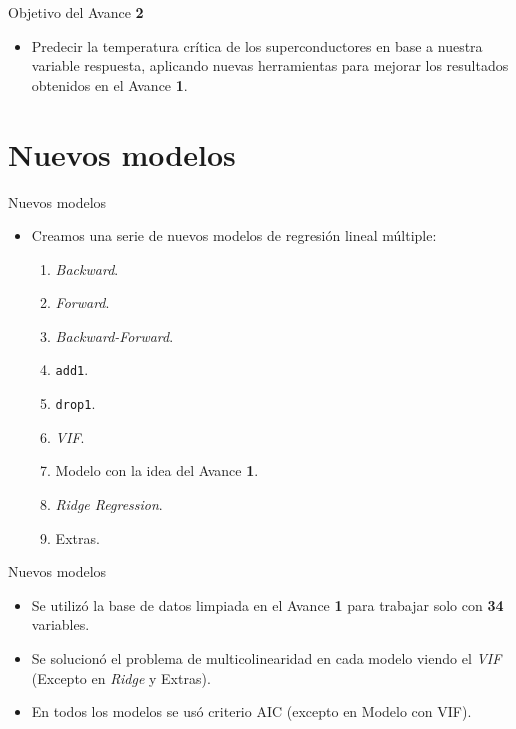 \documentclass[11pt]{beamer}
\newcommand{\cod}[1]{\texttt{\frenchspacing#1}}
\begin{document}
\begin{frame}{Objetivo del Avance \textbf{2}}
	\begin{itemize}
		\item Predecir la temperatura crítica de los superconductores en base a nuestra variable respuesta, aplicando nuevas herramientas para mejorar los resultados obtenidos en el Avance \textbf{1}.
	\end{itemize}
\end{frame}


\section{Nuevos modelos}

\begin{frame}{Nuevos modelos}
	\begin{itemize}
		\item Creamos una serie de nuevos modelos de regresión lineal múltiple:
		\begin{enumerate}
			\item \textit{Backward}.
			\pause
			\item \textit{Forward}.
			\pause
			\item \textit{Backward-Forward}.
			\pause
			\item \cod{add1}.
			\pause
			\item \cod{drop1}.
			\pause
			\item \textit{VIF}.
			\pause
			\item Modelo con la idea del Avance \textbf{1}.
			\pause
			\item \textit{Ridge Regression}.
			\pause
			\item Extras.
		\end{enumerate}
	\end{itemize}
\end{frame}

\begin{frame}{Nuevos modelos}
	\begin{itemize}
		\item Se utilizó la base de datos limpiada en el Avance \textbf{1} para trabajar solo con \textbf{34} variables.
		\pause
		\item Se solucionó el problema de multicolinearidad en cada modelo viendo el \textit{VIF} (Excepto en \textit{Ridge} y Extras).
		\pause
		\item En todos los modelos se usó criterio AIC (excepto en Modelo con VIF).
	\end{itemize}
\end{frame}
\end{document}
